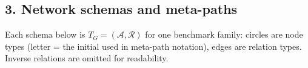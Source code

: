 \newcommand{\pTwoTgt}{orange!22}
\newcommand{\pTwoAgt}{blue!12}
\newcommand{\pTwoAtt}{green!14}
\newcommand{\pTwoVen}{purple!12}

\subsection*{3. Network schemas and meta-paths}
\label{p2:sec:schemas}

Each schema below is $T_G=(\mathcal{A},\mathcal{R})$ for one benchmark family: circles are node
types (letter = the initial used in meta-path notation), edges are relation types. Inverse
relations are omitted for readability.

